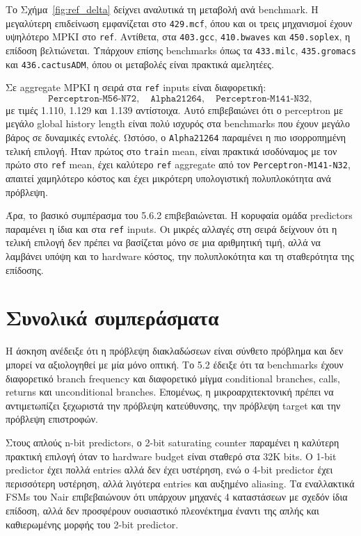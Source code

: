 \documentclass{article}
\begin{document}
Το Σχήμα~\ref{fig:ref_delta} δείχνει αναλυτικά τη μεταβολή ανά benchmark. Η μεγαλύτερη επιδείνωση εμφανίζεται στο \texttt{429.mcf}, όπου και οι τρεις μηχανισμοί έχουν υψηλότερο MPKI στο \texttt{ref}. Αντίθετα, στα \texttt{403.gcc}, \texttt{410.bwaves} και \texttt{450.soplex}, η επίδοση βελτιώνεται. Υπάρχουν επίσης benchmarks όπως τα \texttt{433.milc}, \texttt{435.gromacs} και \texttt{436.cactusADM}, όπου οι μεταβολές είναι πρακτικά αμελητέες.

Σε aggregate MPKI η σειρά στα \texttt{ref} inputs είναι διαφορετική:
\[
    \texttt{Perceptron-M56-N72}, \quad
    \texttt{Alpha21264}, \quad
    \texttt{Perceptron-M141-N32},
\]
με τιμές 1.110, 1.129 και 1.139 αντίστοιχα. Αυτό επιβεβαιώνει ότι ο perceptron με μεγάλο global history length είναι πολύ ισχυρός στα benchmarks που έχουν μεγάλο βάρος σε δυναμικές εντολές. Ωστόσο, ο \texttt{Alpha21264} παραμένει η πιο ισορροπημένη τελική επιλογή. Ήταν πρώτος στο \texttt{train} mean, είναι πρακτικά ισοδύναμος με τον πρώτο στο \texttt{ref} mean, έχει καλύτερο \texttt{ref} aggregate από τον \texttt{Perceptron-M141-N32}, απαιτεί χαμηλότερο κόστος και έχει μικρότερη υπολογιστική πολυπλοκότητα ανά πρόβλεψη.

Άρα, το βασικό συμπέρασμα του 5.6.2 επιβεβαιώνεται. Η κορυφαία ομάδα predictors παραμένει η ίδια και στα \texttt{ref} inputs. Οι μικρές αλλαγές στη σειρά δείχνουν ότι η τελική επιλογή δεν πρέπει να βασίζεται μόνο σε μια αριθμητική τιμή, αλλά να λαμβάνει υπόψη και το hardware κόστος, την πολυπλοκότητα και τη σταθερότητα της επίδοσης.

\FloatBarrier
\section{Συνολικά συμπεράσματα}

Η άσκηση ανέδειξε ότι η πρόβλεψη διακλαδώσεων είναι σύνθετο πρόβλημα και δεν μπορεί να αξιολογηθεί με μία μόνο οπτική. Το 5.2 έδειξε ότι τα benchmarks έχουν διαφορετικό branch frequency και διαφορετικό μίγμα conditional branches, calls, returns και unconditional branches. Επομένως, η μικροαρχιτεκτονική πρέπει να αντιμετωπίζει ξεχωριστά την πρόβλεψη κατεύθυνσης, την πρόβλεψη target και την πρόβλεψη επιστροφών.

Στους απλούς n-bit predictors, ο 2-bit saturating counter παραμένει η καλύτερη πρακτική επιλογή όταν το hardware budget είναι σταθερό στα 32K bits. Ο 1-bit predictor έχει πολλά entries αλλά δεν έχει υστέρηση, ενώ ο 4-bit predictor έχει περισσότερη υστέρηση, αλλά λιγότερα entries και αυξημένο aliasing. Τα εναλλακτικά FSMs του Nair επιβεβαιώνουν ότι υπάρχουν μηχανές 4 καταστάσεων με σχεδόν ίδια επίδοση, αλλά δεν προσφέρουν ουσιαστικό πλεονέκτημα έναντι της απλής και καθιερωμένης μορφής του 2-bit predictor.
\end{document}
